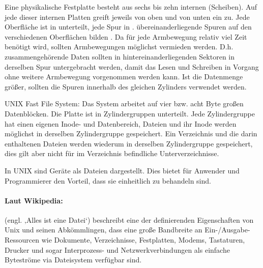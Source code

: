 \begin{answer}
  Eine physikalische Festplatte besteht aus sechs bis zehn internen  (Scheiben). Auf jede
  dieser internen Platten greift jeweils von oben und von unten ein  zu. Jede
  Oberfläche ist in  unterteilt, jede Spur in . übereinanderliegende Spuren auf den
  verschiedenen Oberflächen bilden . Da für jede Armbewegung relativ viel Zeit benötigt
  wird, sollten Armbewegungen möglichst vermieden werden. D.h. zusammengehörende Daten sollten
  in hintereinanderliegenden Sektoren in derselben Spur untergebracht werden, damit das Lesen
  und Schreiben in Vorgang ohne weitere Armbewegung vorgenommen werden kann. Ist die Datenmenge
  größer, sollten die Spuren innerhalb des gleichen Zylinders verwendet werden.

  UNIX Fast File System:
  Das System arbeitet auf vier bzw. acht Byte großen Datenblöcken. Die Platte ist in Zylindergruppen unterteilt. Jede Zylindergruppe hat einen eigenen Inode- und Datenbereich, Dateien und ihr Inode werden möglichst in derselben Zylindergruppe gespeichert. Ein Verzeichnis und die darin enthaltenen Dateien werden wiederum in derselben Zylindergruppe gespeichert, dies gilt aber nicht für im Verzeichnis befindliche Unterverzeichnisse.
\end{answer}

\begin{answer}
  In UNIX sind Geräte als Dateien dargestellt. Dies bietet für Anwender und Programmierer den
  Vorteil, dass sie einheitlich zu behandeln sind.

  \paragraph*{Laut Wikipedia:}
   (engl. ‚Alles ist eine Datei‘) beschreibt eine der definierenden Eigenschaften von Unix und seinen Abkömmlingen, dass eine große Bandbreite an Ein-/Ausgabe-Ressourcen wie Dokumente, Verzeichnisse, Festplatten, Modems, Tastaturen, Drucker und sogar Interprozess- und Netzwerkverbindungen als einfache Byteströme via Dateisystem verfügbar sind.
\end{answer}

